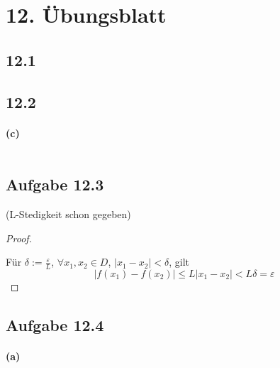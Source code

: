 \section{12. Übungsblatt}

\subsection{12.1}

\subsection{12.2}

\paragraph{(c)}
$ $\newline



\newpage

\subsection{Aufgabe 12.3}

(L-Stedigkeit schon gegeben)

\begin{proof}
$ $\newline

Für $\delta:=\frac{\varepsilon}{L}$, $\forall x_1,x_2\in D$, $|x_1-x_2|<\delta$, gilt
\begin{equation*}
|f(x_1)-f(x_2)|\leq L|x_1-x_2|<L\delta=\varepsilon
\end{equation*}
\end{proof}

\subsection{Aufgabe 12.4}

\paragraph{(a)}
$ $\newline

